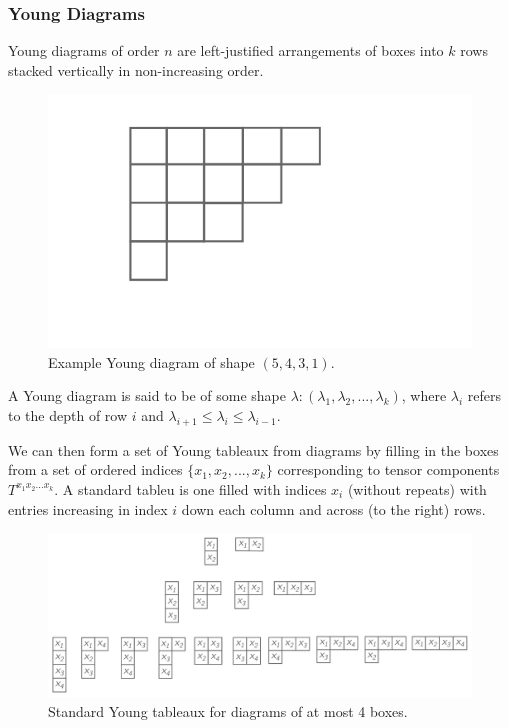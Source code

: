 \documentclass[]{report}
\begin{document}
\subsubsection{Young Diagrams}
Young diagrams of order $n$ are left-justified arrangements of boxes into $k$ rows stacked vertically in non-increasing order. 
\begin{figure}\centering
	\includegraphics[scale=0.6]{youngdiagram-ex.pdf}
	\caption{Example Young diagram of shape $(5,4,3,1)$.}
\end{figure}
A Young diagram is said to be of some shape $\lambda:(\lambda_1,\lambda_2,...,\lambda_k)$, where $\lambda_i$ refers to the depth of row $i$ and $\lambda_{i+1}\leq\lambda_i\leq\lambda_{i-1}$. 

We can then form a set of Young tableaux from diagrams by filling in the boxes from a set of ordered indices $\lbrace x_1,x_2,...,x_k\rbrace$ corresponding to tensor components $T^{x_1x_2...x_k}$.  A standard tableu is one filled with indices $x_i$ (without repeats) with entries increasing in index $i$ down each column and across (to the right) rows.
\begin{figure}\centering
	\includegraphics[scale=0.42]{youngtableaux-ex.pdf}
	\caption{Standard Young tableaux for diagrams of at most 4 boxes.}
\end{figure}
\end{document}
